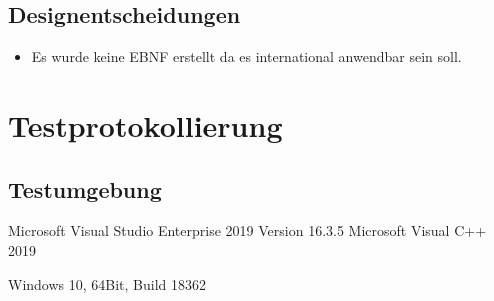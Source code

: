 \subsection{Designentscheidungen}
\begin{itemize}
\item Es wurde keine EBNF erstellt da es international anwendbar sein soll. 
\end{itemize}








\section{Testprotokollierung}


\subsection{Testumgebung}

Microsoft Visual Studio Enterprise 2019
Version 16.3.5
Microsoft Visual C++ 2019

Windows 10, 64Bit, Build 18362

